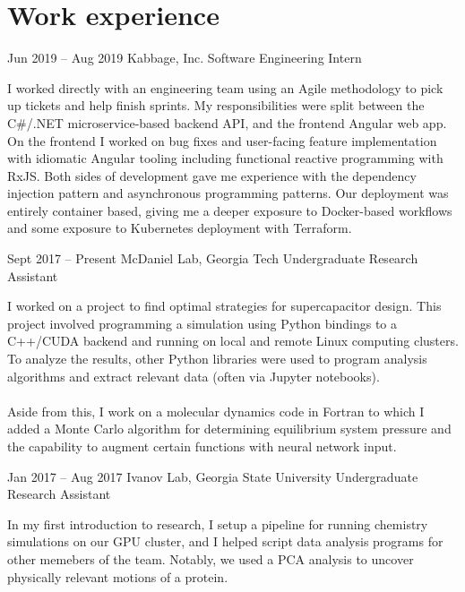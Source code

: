 \documentclass{tccv}
\begin{document}
\begin{minipage}[t]{0.65\textwidth}
\section{Work experience}

\begin{eventlist}

\item{Jun 2019 -- Aug 2019}
     {Kabbage, Inc.}
     {Software Engineering Intern}
     
    I worked directly with an engineering team using an Agile methodology to pick up tickets and help finish sprints. My responsibilities were split between the C\#/.NET microservice-based backend API, and the frontend Angular web app. On the frontend I worked on bug fixes and user-facing feature implementation with idiomatic Angular tooling including functional reactive programming with RxJS. Both sides of development gave me experience with the dependency injection pattern and asynchronous programming patterns. Our deployment was entirely container based, giving me a deeper exposure to Docker-based workflows and some exposure to Kubernetes deployment with Terraform.

\item{Sept 2017 -- Present}
     {McDaniel Lab, Georgia Tech}
     {Undergraduate Research Assistant}

    I worked on a project to find optimal strategies for supercapacitor design. This project involved programming a simulation using Python bindings to a C++/CUDA backend and running on local and remote Linux computing clusters. To analyze the results, other Python libraries were used to program analysis algorithms and extract relevant data (often via Jupyter notebooks).
    \\\\
    Aside from this, I work on a molecular dynamics code in Fortran to which I added a Monte Carlo algorithm for determining equilibrium system pressure and the capability to augment certain functions with neural network input.
    
\item{Jan 2017 -- Aug 2017}
     {Ivanov Lab, Georgia State University}
     {Undergraduate Research Assistant}

    In my first introduction to research, I setup a pipeline for running chemistry simulations on our GPU cluster, and I helped script data analysis programs for other memebers of the team. Notably, we used a PCA analysis to uncover physically relevant motions of a protein. 


\end{eventlist}
\end{minipage}
\end{document}
